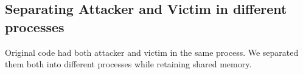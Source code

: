 \subsection{Separating Attacker and Victim in different processes}
Original code had both attacker and victim in the same process. We separated them both into different processes while retaining shared memory.